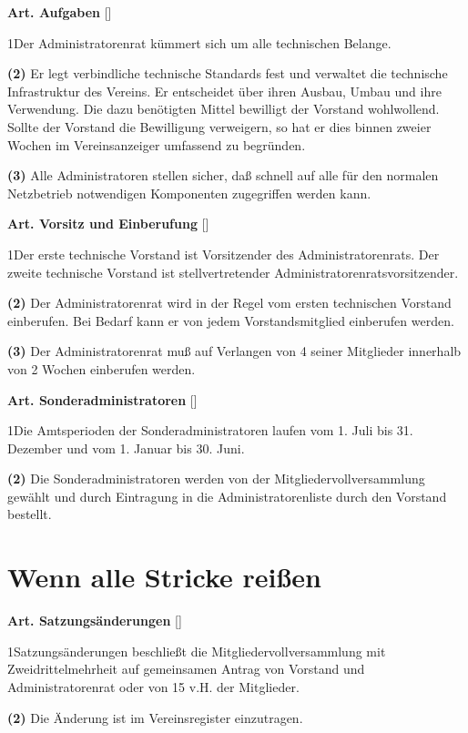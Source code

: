 \documentclass[12pt]{article}
\newcommand{\Abschnitt}[1]{\section{#1}}
\newcommand{\Satz}[2]{

\begin{samepage}
{\bf (#1)} #2
\end{samepage}
}
\newenvironment{Artikel}[2]{
\bigskip \centerline{{\bf Art. #1} [#2]}
\nopagebreak
}{
}
\begin{document}
\begin{Artikel}{26}{Aufgaben}

\Satz{1}{Der Administratorenrat kümmert sich um alle technischen Belange.}

\Satz{2}{Er legt verbindliche technische Standards fest und verwaltet die
technische Infrastruktur des Vereins. Er entscheidet über ihren Ausbau, Umbau
und ihre Verwendung. Die dazu benötigten Mittel bewilligt der Vorstand
wohlwollend. Sollte der Vorstand die Bewilligung verweigern, so hat er dies
binnen zweier Wochen im Vereinsanzeiger umfassend zu begründen.}

\Satz{3}{Alle Administratoren stellen sicher, daß schnell auf alle für den
normalen Netzbetrieb notwendigen Komponenten zugegriffen werden kann.}

\end{Artikel}

\begin{Artikel}{27}{Vorsitz und Einberufung}

\Satz{1}{Der erste technische Vorstand ist Vorsitzender des
Administratorenrats. Der zweite technische Vorstand ist stellvertretender
Administratorenratsvorsitzender.}

\Satz{2}{Der Administratorenrat wird in der Regel vom ersten technischen
Vorstand einberufen. Bei Bedarf kann er von jedem Vorstandsmitglied
einberufen werden.}

\Satz{3}{Der Administratorenrat muß auf Verlangen von 4 seiner Mitglieder
innerhalb von 2 Wochen einberufen werden.}

\end{Artikel}

\begin{Artikel}{28}{Sonderadministratoren}

\Satz{1}{Die Amtsperioden der Sonderadministratoren laufen vom 1. Juli bis 31.
Dezember und vom 1. Januar bis 30. Juni.}

\Satz{2}{Die Sonderadministratoren werden von der Mitgliedervollversammlung
ge\-wählt und durch Eintragung in die Administratorenliste durch den Vorstand
bestellt.}

\end{Artikel}


\Abschnitt{Wenn alle Stricke reißen}

\begin{Artikel}{29}{Satzungsänderungen}

\Satz{1}{Satzungsänderungen beschließt die Mitgliedervollversammlung mit
Zweidrittelmehrheit auf gemeinsamen Antrag von Vorstand und Administratorenrat
oder von 15 v.H. der Mitglieder.}

\Satz{2}{Die Änderung ist im Vereinsregister einzutragen.}

\end{Artikel}
\end{document}
